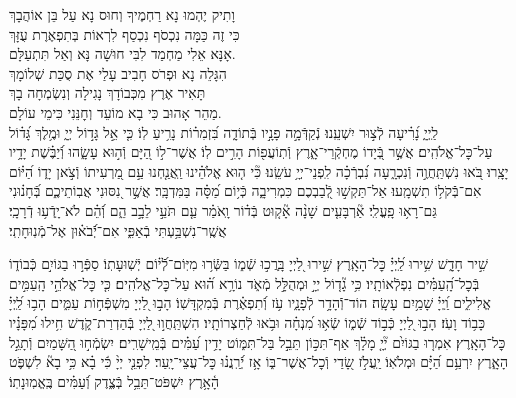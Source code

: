\documentclass[twoside, openany, parskip=half, 11pt]{book}
\begin{document}
	
	וָתִיק יֶהְמוּ נָא רַחְמֶיךָ וְחוּס נָא עַל בֵּן אוֹהֲבָךְ\\
	כִּי זֶה כַּמָּה נִכְסֹף נִכְסַף לִרְאוֹת בְּתִפְאֶרֶת עֻזָּךְ\\
	אָנָּא אֵלִי מַחְמַד לִבִּי חוּשָׁה נָּא וְאַל תִּתְעַלָּם.\\
	
	הִגָּלֵה נָא וּפְרֹס חָבִיב	עָלַי אֶת סֻכַּת שְׁלוֹמָךְ\\
	תָּאִיר אֶרֶץ מִכְּבוֹדָךְ נָגִילָה וְנִשְׂמְחָה בָךְ\\
	מַהֵר אָהוּב כִּי בָא מוֹעֵד וְחׇנֵּנִי כִּימֵי עוֹלָם.\\
	
 לַֽיְיָ֑ נָ֝רִ֗יעָה לְֿצ֣וּר יִשְׁעֵֽנוּ׃
 נְֿקַדְּֿמָ֣ה פָנָ֣יו בְּֿתוֹדָ֑ה בִּ֝זְמִר֗וֹת נָרִ֥יעַ לֽוֹ׃
 כִּ֤י אֵ֣ל גָּד֣וֹל יְיָ֑ וּמֶ֥לֶךְ גָּ֝ד֗וֹל עַל־כׇּל־אֱלֹהִֽים׃
 אֲשֶׁ֣ר בְּֿ֭יָדוֹ מֶחְקְֿרֵי־אָ֑רֶץ וְֿתֽוֹעֲפ֖וֹת הָרִ֣ים לֽוֹ׃
 אֲשֶׁר־ל֣וֹ הַ֭יָּם וְֿה֣וּא עָשָׂ֑הוּ וְֿ֝יַבֶּ֗שֶׁת יָדָ֥יו יָצָֽרוּ׃
 בֹּ֭אוּ נִשְׁתַּֽחֲוֶ֣ה וְֿנִכְרָ֑עָה נִ֝בְרְֿכָ֗ה לִֽפְנֵי־יְיָ֥ עֹשֵֽׂנוּ׃
 כִּ֘י ה֤וּא אֱלֹהֵ֗ינוּ וַֽאֲנַ֤חְנוּ עַ֣ם מַ֭רְעִיתוֹ וְֿצֹ֣אן יָד֑וֹ הַ֝יּ֗וֹם אִם־בְּֿֿקֹל֥וֹ תִשְׁמָֽעוּ׃
 אַל־תַּקְשׁ֣וּ לְֿ֭בַבְכֶם כִּמְרִיבָ֑ה כְּֿי֥וֹם מַ֝סָּ֗ה בַּמִּדְבָּֽר׃
 אֲשֶׁ֣ר נִ֭סּוּנִי אֲבֽוֹתֵיכֶ֑ם בְּֿ֝חָנ֗וּנִי גַּם־רָא֥וּ פָֽעֳלִֽי׃
 אַ֘רְבָּעִ֤ים שָׁנָ֨ה אָ֘ק֤וּט בְּֿד֗וֹר וָֽאֹמַ֗ר עַ֤ם תֹּעֵ֣י לֵבָ֣ב הֵ֑ם וְֿ֝הֵ֗ם לֹא־יָֽדְֿע֥וּ דְֿרָכָֽי׃
 אֲשֶֽׁר־נִשְׁבַּ֥עְתִּי בְֿאַפִּ֑י אִם־יְֿֿ֝בֹא֗וּן אֶל־מְֿנֽוּחָתִֽי׃


 שִׁ֣יר חָדָ֑שׁ שִׁ֥ירוּ לַֽ֝יְיָ֗ כׇּל־הָאָֽרֶץ׃
 שִׁ֣ירוּ לַ֭יְיָ בָּֽרֲכ֣וּ שְֿׁמ֑וֹ בַּשְּֿׂר֥וּ מִיּֽוֹם־לְֿֿ֝י֗וֹם יְֿשֽׁוּעָתֽוֹ׃
 סַפְּֿר֣וּ בַגּוֹיִ֣ם כְּֿבוֹד֑וֹ בְּֿכׇל־הָֽ֝עַמִּ֗ים נִפְלְֿאוֹתָֽיו׃
 כִּ֥י גָ֘ד֤וֹל יְיָ֣ וּמְהֻלָּ֣ל מְֿאֹ֑ד נוֹרָ֥א ה֝֗וּא עַל־כׇּל־אֱלֹהִֽים׃
 כִּ֤י כׇּל־אֱלֹהֵ֣י הָֽעַמִּ֣ים אֱלִילִ֑ים וַֽ֝יְיָ֗ שָׁמַ֥יִם עָשָֽׂה׃
 הוֹד־וְֿֿהָדָ֥ר לְֿפָנָ֑יו עֹ֥ז וְֿ֝תִפְאֶ֗רֶת בְּֿמִקְדָּשֽׁוֹ׃
 הָב֣וּ לַ֭יְיָ מִשְׁפְּֿח֣וֹת עַמִּ֑ים הָב֥וּ לַֽ֝יְיָ֗ כָּב֥וֹד וָעֹֽז׃
 הָב֣וּ לַ֭יְיָ כְּֿב֣וֹד שְֿׁמ֑וֹ שְֿׂא֥וּ מִ֝נְחָ֗ה וּבֹ֥אוּ לְֿחַצְרוֹתָֽיו׃
 הִשְׁתַּֽחֲו֣וּ לַ֭יְיָ בְּֿהַדְרַת־קֹ֑דֶשׁ חִ֥ילוּ מִ֝פָּנָ֗יו כׇּל־הָאָֽרֶץ׃
 אִמְר֤וּ בַגּוֹיִ֨ם יְ֘יָ֤ מָלָ֗ךְ אַף־תִּכּ֣וֹן תֵּבֵ֣ל בַּל־תִּמּ֑וֹט יָדִ֥ין עַ֝מִּ֗ים בְּֿמֵֽישָׁרִֽים׃
 יִשְׂמְֿח֣וּ הַ֭שָּׁמַיִם וְֿתָגֵ֣ל הָאָ֑רֶץ יִרְעַ֥ם הַ֝יָּ֗ם וּמְלֹאֽוֹ׃
 יַֽעֲלֹ֣ז שָׂ֭דַי וְֿכׇל־אֲשֶׁר־בּ֑וֹ אָ֥ז יְֿ֝רַֽנֲנ֗וּ כׇּל־עֲצֵי־יָֽעַר׃
 לִפְנֵ֤י יְיָ֨ כִּ֬י בָ֗א כִּ֥י בָא֘ לִשְׁפֹּ֢ט הָ֫אָ֥רֶץ יִשְׁפֹּט־תֵּבֵ֥ל בְּֿצֶ֑דֶק וְֿ֝עַמִּ֗ים בֶּֽאֱמֽוּנָתֽוֹ׃
\end{document}

